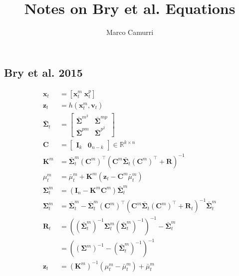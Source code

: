 \documentclass[a4paper]{article}
\title{Notes on Bry et al. \cite{bry2015ijrr} Equations}
\date{\vspace{-5ex}}
\author{Marco Camurri}
\numberwithin{equation}{section}
\newcommand{\x}{\mathbf{x}}
\newcommand{\z}{\mathbf{z}}
\newcommand{\vv}{\mathbf{v}}
\newcommand{\cov}{\boldsymbol{\Sigma}}
\newcommand{\bcov}{\bar{\cov}}
\newcommand{\C}{\mathbf{C}}
\newcommand{\I}[1]{\mathbf{I}_{#1}}
\newcommand{\Zero}[1]{\boldsymbol{0}_{#1}}
\newcommand{\Real}{\mathbb{R}}
\newcommand{\K}{\mathbf{K}}
\newcommand{\R}{\mathbf{R}}
\newcommand{\transpose}{{\intercal}}
\newcommand{\inverse}{{-1}}
\begin{document}
\maketitle
\begin{paracol}{2}
\appendix
 \section{Bry et al. 2015 \cite{bry2015ijrr}}
\begin{align}
  \x_t &= [ \x_t^m \; \x_t^p ] \label{eq:1}\\
  \z_t &= h(\x_t^m, \vv_t) \label{eq:2}\\
  \bar{\cov}_t &= \begin{bmatrix}
                  \bcov^{m^2} & \bcov^{mp} \\
                  \bcov^{pm} & \bcov^{p^2}
                 \end{bmatrix} \label{eq:3}\\
 \C &= \begin{bmatrix} \I{k} & \Zero{n-k} \end{bmatrix} \in \Real^{k\times n}
\label{eq:4}\\
 \K^m &= \bcov^m_t(\C^m)^\transpose(\C^m\bcov_t(\C^m)^\transpose+\R)^\inverse
\label{eq:5}\\
 \mu_t^m &= \bar{\mu}^m_t + \K^m(\z_t - \C^m \bar{\mu}_t^m) \label{eq:6}\\
 \cov^m_t &= (\I{n} - \K^m \C^m)\bcov^m_t \label{eq:7}\\
  \cov^m_t &= \bcov^m_t - \bcov^m_t(\C^m)^\transpose(\C^m
\bcov_t(\C^m)^\transpose + \R_t)^\inverse \bcov^m_t \label{eq:8}\\
\R_t &= (({\bcov^{m}_t})^\inverse \cov^m_t ({\bcov^m_t})^\inverse)^\inverse -
\bcov^m_t \nonumber\\
&= ((\cov^m)^{\inverse} - ({\bcov^m_t})^\inverse)^\inverse \label{eq:9}\\
\z_t &= (\K^{m})^\inverse(\mu^m_t - \bar{\mu}^m_t) + \bar{\mu}^m_t \label{eq:10}
\end{align}
\switchcolumn
\appendix
\setcounter{section}{1}

\end{paracol}
\end{document}
